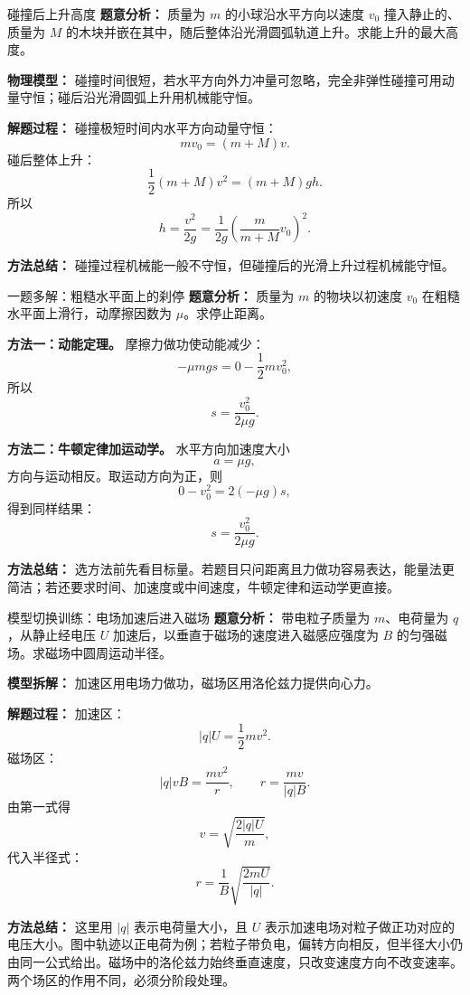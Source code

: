 \begin{examplebox}{碰撞后上升高度}
\textbf{题意分析：} 质量为 $m$ 的小球沿水平方向以速度 $v_0$ 撞入静止的、质量为 $M$ 的木块并嵌在其中，随后整体沿光滑圆弧轨道上升。求能上升的最大高度。

\textbf{物理模型：} 碰撞时间很短，若水平方向外力冲量可忽略，完全非弹性碰撞可用动量守恒；碰后沿光滑圆弧上升用机械能守恒。

\begin{center}

\end{center}

\textbf{解题过程：}
碰撞极短时间内水平方向动量守恒：
\[
mv_0=(m+M)v.
\]
碰后整体上升：
\[
\frac12(m+M)v^2=(m+M)gh.
\]
所以
\[
h=\frac{v^2}{2g}
=\frac{1}{2g}\left(\frac{m}{m+M}v_0\right)^2.
\]

\textbf{方法总结：} 碰撞过程机械能一般不守恒，但碰撞后的光滑上升过程机械能守恒。
\end{examplebox}

\begin{examplebox}{一题多解：粗糙水平面上的刹停}
\textbf{题意分析：} 质量为 $m$ 的物块以初速度 $v_0$ 在粗糙水平面上滑行，动摩擦因数为 $\mu$。求停止距离。

\textbf{方法一：动能定理。}
摩擦力做功使动能减少：
\[
-\mu mg s=0-\frac12mv_0^2,
\]
所以
\[
s=\frac{v_0^2}{2\mu g}.
\]

\textbf{方法二：牛顿定律加运动学。}
水平方向加速度大小
\[
a=\mu g,
\]
方向与运动相反。取运动方向为正，则
\[
0-v_0^2=2(-\mu g)s,
\]
得到同样结果：
\[
s=\frac{v_0^2}{2\mu g}.
\]

\textbf{方法总结：} 选方法前先看目标量。若题目只问距离且力做功容易表达，能量法更简洁；若还要求时间、加速度或中间速度，牛顿定律和运动学更直接。
\end{examplebox}

\begin{examplebox}{模型切换训练：电场加速后进入磁场}
\textbf{题意分析：} 带电粒子质量为 $m$、电荷量为 $q$，从静止经电压 $U$ 加速后，以垂直于磁场的速度进入磁感应强度为 $B$ 的匀强磁场。求磁场中圆周运动半径。

\textbf{模型拆解：} 加速区用电场力做功，磁场区用洛伦兹力提供向心力。

\begin{center}

\end{center}

\textbf{解题过程：}
加速区：
\[
|q|U=\frac12mv^2.
\]
磁场区：
\[
|q|vB=\frac{mv^2}{r},\qquad r=\frac{mv}{|q|B}.
\]
由第一式得
\[
v=\sqrt{\frac{2|q|U}{m}},
\]
代入半径式：
\[
r=\frac1B\sqrt{\frac{2mU}{|q|}}.
\]

\textbf{方法总结：} 这里用 $|q|$ 表示电荷量大小，且 $U$ 表示加速电场对粒子做正功对应的电压大小。图中轨迹以正电荷为例；若粒子带负电，偏转方向相反，但半径大小仍由同一公式给出。磁场中的洛伦兹力始终垂直速度，只改变速度方向不改变速率。两个场区的作用不同，必须分阶段处理。
\end{examplebox}

